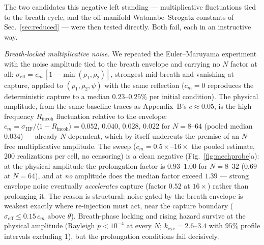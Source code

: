 

The two candidates this negative left standing --- multiplicative fluctuations
tied to the breath cycle, and the off-manifold Watanabe--Strogatz constants of
Sec.~\ref{sec:reduced} --- were then tested directly. Both fail, each in an
instructive way.

\emph{Breath-locked multiplicative noise.} We repeated the Euler--Maruyama
experiment with the noise amplitude tied to the breath envelope and carrying no
$N$ factor at all: $\sigma_{\mathrm{eff}} = c_m\,[1 - \min(\rho_1,\rho_2)]$,
strongest mid-breath and vanishing at capture, applied to $(\rho_1,\rho_2,\psi)$
with the same reflection ($c_m = 0$ reproduces the deterministic capture to a
median $0.23$--$0.25\%$ per initial condition). The physical amplitude, from the
same baseline traces as Appendix~B's $c \approx 0.05$, is the high-frequency
$R_{\mathrm{incoh}}$ fluctuation relative to the envelope:
$c_m = \sigma_{\mathrm{HF}}/\langle 1 - R_{\mathrm{incoh}}\rangle = 0.052$,
$0.040$, $0.028$, $0.022$ for $N = 8$--$64$ (pooled median $0.034$) --- already
$N$-dependent, which by itself undercuts the premise of an $N$-free
multiplicative amplitude. The sweep ($c_m = 0.5\times$--$16\times$ the pooled
estimate, $200$ realizations per cell, no censoring) is a clean negative
(Fig.~\ref{fig:mechprobe}a): at the physical amplitude the prolongation factor
is $0.93$--$1.00$ for $N = 8$--$32$ ($0.69$ at $N = 64$), and at \emph{no}
amplitude does the median factor exceed $1.39$ --- strong envelope noise
eventually \emph{accelerates} capture (factor $0.52$ at $16\times$) rather than
prolonging it. The reason is structural: noise gated by the breath envelope is
weakest exactly where re-injection must act, near the capture boundary
($\sigma_{\mathrm{eff}} \le 0.15\,c_m$ above $\theta$). Breath-phase locking and
rising hazard survive at the physical amplitude (Rayleigh $p < 10^{-4}$ at
every $N$; $k_{\mathrm{cyc}} = 2.6$--$3.4$ with $95\%$
profile intervals excluding $1$), but the prolongation conditions fail
decisively.

